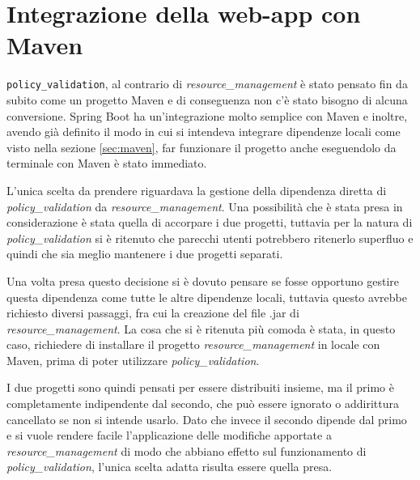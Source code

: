 \section{Integrazione della web-app con Maven}
\texttt{policy\_validation}, al contrario di \emph{resource\_management} è stato pensato fin da subito come un progetto Maven e di conseguenza non c'è stato bisogno di alcuna conversione. Spring Boot ha un'integrazione molto semplice con Maven e inoltre, avendo già definito il modo in cui si intendeva integrare dipendenze locali come visto nella sezione \ref{sec:maven}, far funzionare il progetto anche eseguendolo da terminale con Maven è stato immediato.\par
L'unica scelta da prendere riguardava la gestione della dipendenza diretta di \emph{policy\_validation} da \emph{resource\_management}. Una possibilità che è stata presa in considerazione è stata quella di accorpare i due progetti, tuttavia per la natura di \emph{policy\_validation} si è ritenuto che parecchi utenti potrebbero ritenerlo superfluo e quindi che sia meglio mantenere i due progetti separati.\par
Una volta presa questo decisione si è dovuto pensare se fosse opportuno gestire questa dipendenza come tutte le altre dipendenze locali, tuttavia questo avrebbe richiesto diversi passaggi, fra cui la creazione del file .jar di \emph{resource\_management}. La cosa che si è ritenuta più comoda è stata, in questo caso, richiedere di installare il progetto \emph{resource\_management} in locale con Maven, prima di poter utilizzare \emph{policy\_validation}.\par
I due progetti sono quindi pensati per essere distribuiti insieme, ma il primo è completamente indipendente dal secondo, che può essere ignorato o addirittura cancellato se non si intende usarlo. Dato che invece il secondo dipende dal primo e si vuole rendere facile l'applicazione delle modifiche apportate a \emph{resource\_management} di modo che abbiano effetto sul funzionamento di \emph{policy\_validation}, l'unica scelta adatta risulta essere quella presa.

